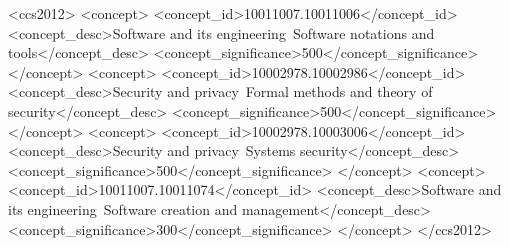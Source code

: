 \documentclass[acmsmall,screen,review,anonymous,authoryear]{acmart}
\begin{document}
\begin{CCSXML}
	<ccs2012>
	<concept>
	<concept_id>10011007.10011006</concept_id>
	<concept_desc>Software and its engineering~Software notations and tools</concept_desc>
	<concept_significance>500</concept_significance>
	</concept>
	<concept>
	<concept_id>10002978.10002986</concept_id>
	<concept_desc>Security and privacy~Formal methods and theory of security</concept_desc>
	<concept_significance>500</concept_significance>
	</concept>
	<concept>
	<concept_id>10002978.10003006</concept_id>
	<concept_desc>Security and privacy~Systems security</concept_desc>
	<concept_significance>500</concept_significance>
	</concept>
	<concept>
	<concept_id>10011007.10011074</concept_id>
	<concept_desc>Software and its engineering~Software creation and management</concept_desc>
	<concept_significance>300</concept_significance>
	</concept>
	</ccs2012>
\end{CCSXML}





\maketitle













\end{document}
